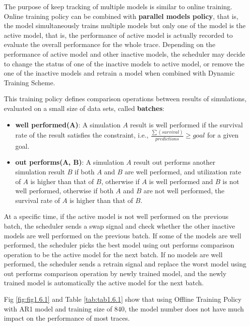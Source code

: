 \documentclass{article}
\begin{document}
\begin{flushleft}
The purpose of keep tracking of multiple models is similar to online training. Online training policy can be combined with \textbf{parallel models policy}, that is, the model simultaneously trains multiple models but only one of the model is the active model, that is, the performance of active model is actually recorded to evaluate the overall performance for the whole trace. Depending on the performance of active model and other inactive models, the scheduler may decide to change the status of one of the inactive models to active model, or remove the one of the inactive models and retrain a model when combined with Dynamic Training Scheme.

This training policy defines comparison operations between results of simulations, evaluated on a small size of data sets, called \textbf{batches}:

\begin{itemize}
    \item \textbf{well performed(A)}: A simulation $A$ result is well performed if the survival rate of the result satisfies the constraint, i.e., $\frac{\sum(survival)}{predictions} \geq goal$ for a given goal.
    \item \textbf{out performs(A, B)}: A simulation $A$ result out performs another simulation result $B$ if both $A$ and $B$ are well performed, and utilization rate of $A$ is higher than that of $B$, otherwise if $A$ is well performed and $B$ is not well performed, otherwise if both $A$ and $B$ are not well performed, the survival rate of $A$ is higher than that of $B$.
\end{itemize}

At a specific time, if the active model is not well performed on the previous batch, the scheduler sends a swap signal and check whether the other inactive models are well performed on the previous batch. If some of the models are well performed, the scheduler picks the best model using out performs comparison operation to be the active model for the next batch. If no models are well performed, the scheduler sends a retrain signal and replace the worst model using out performs comparison operation by newly trained model, and the newly trained model is automatically the active model for the next batch.

Fig \ref{fig:fig1.6.1} and Table \ref{tab:tab1.6.1} show that using Offline Training Policy with AR1 model and training size of 840, the model number does not have much impact on the performance of most traces.


\end{flushleft}
\end{document}
